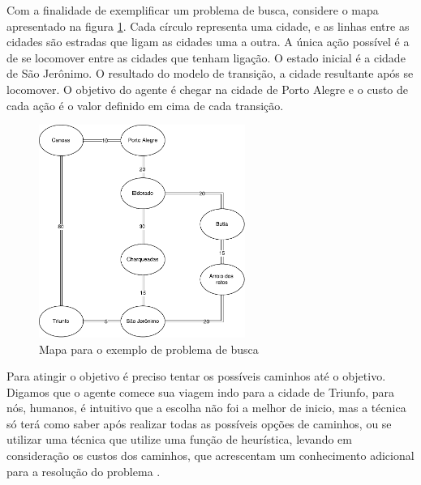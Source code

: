 
Com a finalidade de exemplificar um problema de busca, considere o mapa apresentado na figura \ref{fig:mapabusca}. Cada círculo representa uma cidade, e as linhas entre as cidades são estradas que ligam as cidades uma a outra. A única ação possível é a de se locomover entre as cidades que tenham ligação. O estado inicial é a cidade de São Jerônimo. O resultado do modelo de transição, a cidade resultante após se locomover. O objetivo do agente é chegar na cidade de Porto Alegre e o custo de cada ação é o valor definido em cima de cada transição. 

\begin{figure}[ht]
	\centering
	\includegraphics[width=0.6\textwidth]{fig/mapabusca.pdf}
	\caption{Mapa para o exemplo de problema de busca}
	\label{fig:mapabusca}
\end{figure} 

Para atingir o objetivo é preciso tentar os possíveis caminhos até o objetivo. Digamos que o agente comece sua viagem indo para a cidade de Triunfo, para nós, humanos, é intuitivo que a escolha não foi a melhor de inicio, mas a técnica só terá como saber após realizar todas as possíveis opções de caminhos, ou se utilizar uma técnica que utilize uma função de heurística, levando em consideração os custos dos caminhos, que acrescentam um conhecimento adicional para a resolução do problema \cite{intelligence2003modern}.

